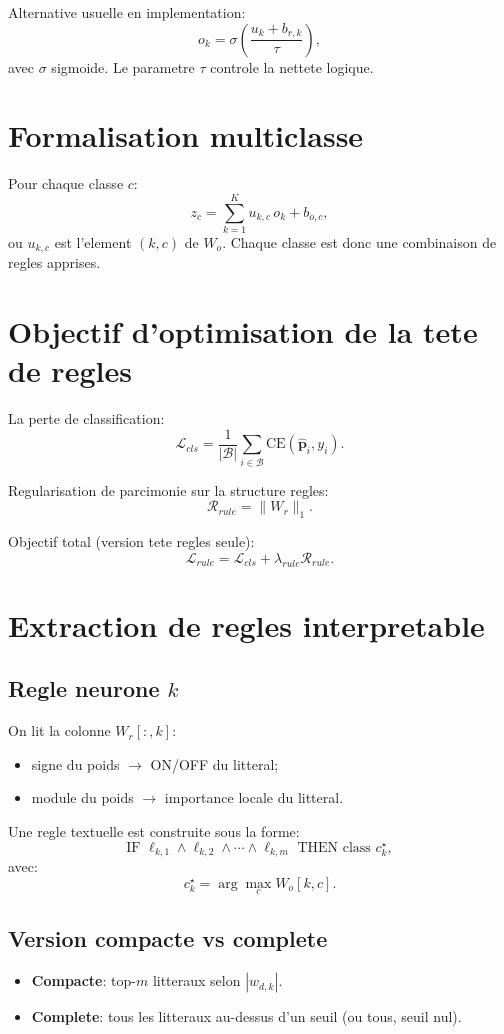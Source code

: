 \documentclass[11pt,a4paper]{article}
\begin{document}
Alternative usuelle en implementation:
\[
o_k=\sigma\!\left(\frac{u_k+b_{r,k}}{\tau}\right),
\]
avec $\sigma$ sigmoide.
Le parametre $\tau$ controle la nettete logique.

\section{Formalisation multiclasse}
Pour chaque classe $c$:
\[
z_c=\sum_{k=1}^{K} u_{k,c}\,o_k+b_{o,c},
\]
ou $u_{k,c}$ est l'element $(k,c)$ de $W_o$.
Chaque classe est donc une combinaison de regles apprises.

\section{Objectif d'optimisation de la tete de regles}
La perte de classification:
\[
\mathcal{L}_{cls}
=\frac{1}{|\mathcal{B}|}\sum_{i\in\mathcal{B}}
\text{CE}\!\left(\hat{\bm{p}}_i,y_i\right).
\]

Regularisation de parcimonie sur la structure regles:
\[
\mathcal{R}_{rule}=\|W_r\|_1.
\]

Objectif total (version tete regles seule):
\[
\mathcal{L}_{rule}
=\mathcal{L}_{cls}+\lambda_{rule}\mathcal{R}_{rule}.
\]

\section{Extraction de regles interpretable}
\subsection{Regle neurone $k$}
On lit la colonne $W_r[:,k]$:
\begin{itemize}
    \item signe du poids $\to$ ON/OFF du litteral;
    \item module du poids $\to$ importance locale du litteral.
\end{itemize}

Une regle textuelle est construite sous la forme:
\[
\text{IF } \ell_{k,1}\wedge \ell_{k,2}\wedge \cdots \wedge \ell_{k,m}
\text{ THEN class } c^\star_k,
\]
avec:
\[
c^\star_k=\arg\max_{c} W_o[k,c].
\]

\subsection{Version compacte vs complete}
\begin{itemize}
    \item \textbf{Compacte}: top-$m$ litteraux selon $|w_{d,k}|$.
    \item \textbf{Complete}: tous les litteraux au-dessus d'un seuil (ou tous, seuil nul).
\end{itemize}
\end{document}

